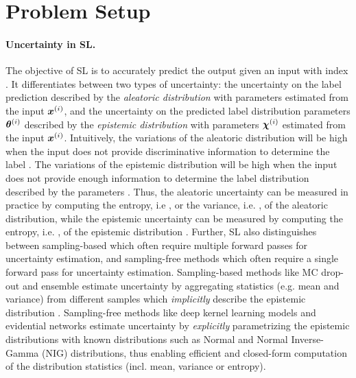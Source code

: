 \vspace{-3mm}
\section{Problem Setup}
\label{sec:setup_011}

\paragraph{Uncertainty in SL.} The objective of SL is to accurately predict the output \smash{$\y\dataix$} given an input \smash{$\x\dataix$} with index \smash{$\idata$}. It differentiates between two types of uncertainty: the uncertainty on the label prediction \smash{$\y\dataix$} described by the \emph{aleatoric distribution} \smash{$\prob(\y\dataix \mid \expparam\dataix)$} with parameters \smash{$\expparam\dataix$} estimated from the input $\x\dataix$, and the uncertainty on the predicted label distribution parameters $\expparam\dataix$ described by the \emph{epistemic distribution} \smash{$\prior(\expparam\dataix \mid \priorparam\dataix)$} with parameters $\priorparam\dataix$ estimated from the input $\x\dataix$. Intuitively, the variations of the aleatoric distribution will be high when the input \smash{$\x\dataix$} does not provide discriminative information to determine the label \smash{$\y\dataix$}. The variations of the epistemic distribution will be high when the input \smash{$\x\dataix$} does not provide enough information to determine the label distribution \smash{$\prior(\expparam\dataix \mid \priorparam\dataix)$} described by the parameters \smash{$\priorparam\dataix$}. Thus, the aleatoric uncertainty can be measured in practice by computing the entropy, i.e , or the variance, i.e. , of the aleatoric distribution, while the epistemic uncertainty can be measured by computing the entropy, i.e. , of the epistemic distribution \cite{PriorNetworks, charpentier2020, natpn}. Further, SL also distinguishes between sampling-based which often require multiple forward passes for uncertainty estimation, and sampling-free methods which often require a single forward pass for uncertainty estimation. Sampling-based methods like MC drop-out \cite{dropout} and ensemble \cite{ensembles, hyper-ensembles, batch-ensembles} estimate uncertainty by aggregating statistics (e.g. mean and variance) from different samples which \emph{implicitly} describe the epistemic distribution \smash{$\prior(\expparam\dataix \mid \priorparam\dataix)$}. Sampling-free methods like deep kernel learning models \cite{simple-baseline-uncertainty, due, duq, uceloss} and evidential networks \cite{charpentier2020, PriorNetworks, natpn, evidential-regression} estimate uncertainty by \emph{explicitly} parametrizing the epistemic distributions \smash{$\prior(\expparam\dataix) \mid \priorparam\dataix)$} with known distributions such as Normal and Normal Inverse-Gamma (NIG) distributions, thus enabling efficient and closed-form computation of the distribution statistics (incl. mean, variance or entropy).


